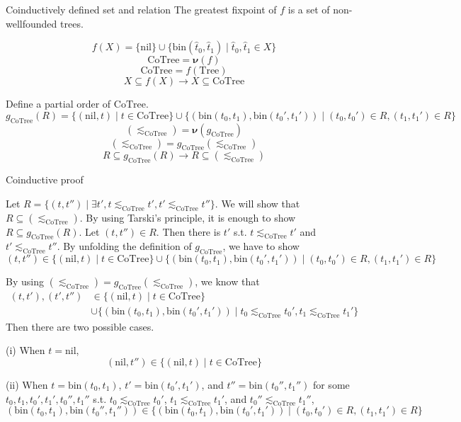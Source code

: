 \documentclass[9pt]{beamer}
\newcommand\Tree[0]{\text{Tree}}
\newcommand\CoTree[0]{\text{CoTree}}
\newcommand\nil[0]{\text{nil}}
\newcommand\bin[0]{\text{bin}}
\newcommand\cofix[0]{\boldsymbol{\nu}}
\begin{document}
\begin{frame}{Coinductively defined set and relation}
  The greatest fixpoint of $f$ is a set of non-wellfounded trees.

  $$ f(X) = \{\nil\} \cup \{\bin(\hat t_0, \hat t_1) \mid \hat t_0, \hat t_1 \in X\} $$
  $$ \CoTree = \cofix(f) $$
  $$ \CoTree = f(\Tree) $$
  $$ X \subseteq f(X) \to X \subseteq \CoTree $$

  Define a partial order of $\CoTree$.
  $$ g_{\CoTree}(R) =
    \{(\nil,t) \mid t \in \CoTree\} \cup
    \{(\bin(t_0, t_1), \bin(t_0', t_1')) \mid (t_0, t_0') \in R, (t_1, t_1') \in R \}
  $$
  $$ (\lesssim_{\CoTree}) = \cofix(g_{\CoTree}) $$
  $$ (\lesssim_{\CoTree}) = g_{\CoTree}(\lesssim_{\CoTree}) $$
  $$ R \subseteq g_{\CoTree}(R) \to R \subseteq (\lesssim_{\CoTree}) $$
\end{frame}

\begin{frame}{Coinductive proof}
  \begin{example}[Transitivity of $\lesssim_{\CoTree}$]
    Let $R = \{(t, t'') \mid \exists t', t \lesssim_\CoTree t', t' \lesssim_\CoTree t''\}$.
    We will show that $R \subseteq (\lesssim_\CoTree)$.
    By using Tarski's principle, it is enough to show $R \subseteq g_\CoTree(R)$.
    Let $(t, t'') \in R$. Then there is $t'$ s.t. $t \lesssim_\CoTree t'$ and $t' \lesssim_\CoTree t''$.
    By unfolding the definition of $g_\CoTree$,
    we have to show
    $$ (t, t'') \in
       \{(\nil,t) \mid t \in \CoTree\} \cup
       \{(\bin(t_0, t_1), \bin(t_0', t_1')) \mid (t_0, t_0') \in R, (t_1, t_1') \in R \}
    $$

    By using $(\lesssim_\CoTree) = g_\CoTree(\lesssim_\CoTree)$, we know that
    $$
      \begin{aligned}
        (t,t'), (t', t'')
        & \in \{(\nil,t) \mid t \in \CoTree\} \\
        & \cup \{(\bin(t_0, t_1), \bin(t_0', t_1')) \mid t_0 \lesssim_\CoTree t_0', t_1 \lesssim_\CoTree t_1' \}
      \end{aligned}
    $$
    Then there are two possible cases.

    (i) When $t = \nil$,
        $$(\nil, t'') \in \{(\nil,t) \mid t \in \CoTree\}$$

    (ii) When $t = \bin(t_0, t_1)$, $t' = \bin(t_0', t_1')$, and $t'' = \bin(t_0'', t_1'')$ for some $t_0, t_1, t_0', t_1', t_0'', t_1''$ s.t.
          $t_0 \lesssim_\CoTree t_0'$, $t_1 \lesssim_\CoTree t_1'$, and $t_0'' \lesssim_\CoTree t_1''$,
        $$ (\bin(t_0, t_1), \bin(t_0'', t_1'')) \in
           \{(\bin(t_0, t_1), \bin(t_0', t_1')) \mid (t_0, t_0') \in R, (t_1, t_1') \in R \}
        $$
  \end{example}
\end{frame}
\end{document}
